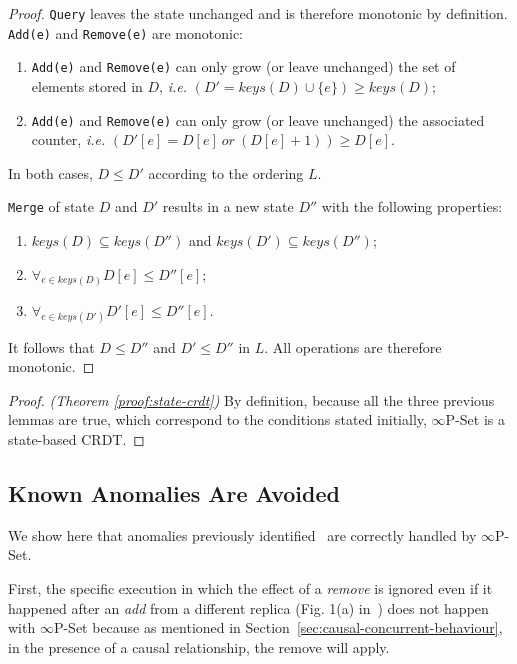 \documentclass[11pt, oneside]{article}   	%
\begin{document}
\begin{proof}
\texttt{Query} leaves the state unchanged and is therefore monotonic by definition. \texttt{Add(e)} and \texttt{Remove(e)} are monotonic: 
\begin{enumerate}
    \item \texttt{Add(e)} and \texttt{Remove(e)} can only grow (or leave unchanged) the set of elements stored in $D$, \textit{i.e.} $(D' = \textit{keys}(D) \cup \{ e \}) \geq \textit{keys}(D)$; 
    \item \texttt{Add(e)} and \texttt{Remove(e)} can only grow (or leave unchanged) the associated counter, \textit{i.e.} $(D'[e] = D[e] ~\textit{or}~ (D[e] + 1)) \geq D[e]$. 
\end{enumerate}
In both cases, $D \leq D'$ according to the ordering $L$.

\texttt{Merge} of state $D$ and $D'$ results in a new state $D''$ with the following properties:
\begin{enumerate}
    \item $\textit{keys}(D) \subseteq \textit{keys}(D'')$ and $\textit{keys}(D') \subseteq \textit{keys}(D'')$;
    \item $\forall_{e \in \textit{keys}(D)} D[e] \leq D''[e]$; 
    \item $\forall_{e \in \textit{keys}(D')} D'[e] \leq D''[e]$.
\end{enumerate}
It follows that $D \leq D''$ and $D' \leq D''$ in $L$. All operations are therefore monotonic.
\end{proof}

\begin{proof}
\textit{(Theorem \ref{proof:state-crdt})}
By definition, because all the three previous lemmas are true, which correspond to the conditions stated initially, $\infty$P-Set is a state-based CRDT.
\end{proof} 

\subsection{Known Anomalies Are Avoided}

We show here that anomalies previously identified~\cite{bieniusa:hal-00769554} are correctly handled by $\infty$P-Set. 

First, the specific execution in which the effect of a \textit{remove} is ignored even if it happened after an \textit{add} from a different replica (Fig. 1(a) in~\cite{bieniusa:hal-00769554}) does not happen with $\infty$P-Set because as mentioned in Section~\ref{sec:causal-concurrent-behaviour}, in the presence of a causal relationship, the remove will apply.
\end{document}
